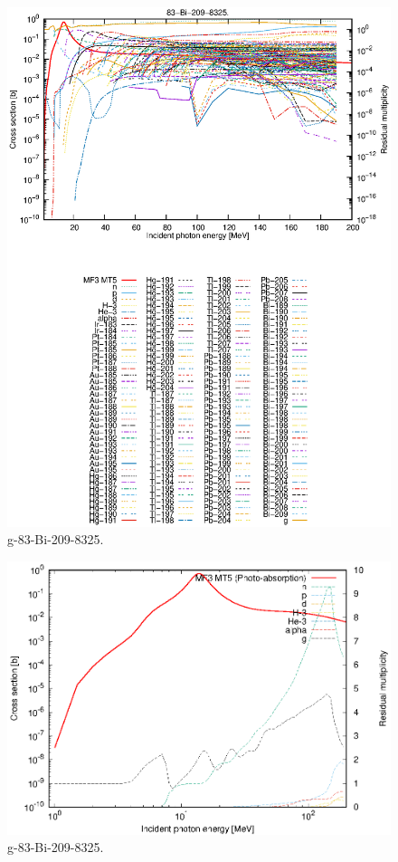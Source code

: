 \begin{figure}
 \includegraphics[width=\linewidth]{eps/g_83-Bi-209_8325.eps}
  \caption{g-83-Bi-209-8325.}
\end{figure}
\newpage \clearpage

\begin{figure}
 \includegraphics[width=\linewidth]{eps-log/g_83-Bi-209_8325.eps}
 \caption{g-83-Bi-209-8325.}
\end{figure}
\newpage \clearpage

